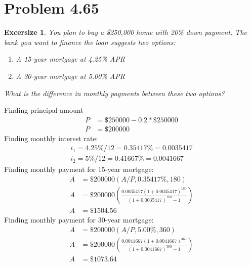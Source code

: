 \documentclass{report} %
\newtheorem{exrc}{Excersize}
\begin{document}
\section*{Problem 4.65}
\begin{exrc}
    You plan to buy a \$250,000 home with 20\% down payment. The bank you want to finance the loan suggests two options:
    \begin{enumerate}
        \item A 15-year mortgage at 4.25\% APR
        \item A 30-year mortgage at 5.00\% APR
    \end{enumerate}
    What is the difference in monthly payments between these two options?
\end{exrc}
Finding principal amount
\begin{equation*}
    \begin{aligned}
        P &= \$250000 - 0.2 * \$250000 \\
        P &= \$200000
    \end{aligned}
\end{equation*}
Finding monthly interest rate:
\begin{equation*}
    \begin{aligned}
        i_1 = 4.25\%/12 = 0.35417\% = 0.0035417 \\
        i_2 = 5\%/12 = 0.41667\% = 0.0041667
    \end{aligned}
\end{equation*}
Finding monthly payment for 15-year mortgage:
\begin{equation*}
    \begin{aligned}
        A &= \$200000(A/P,0.35417\%,180) \\
        A &= \$200000\left(\frac{0.0035417(1+0.0035417)^{180}}{(1+0.0035417)^{180}-1}\right) \\
        A &= \$1504.56
    \end{aligned}
\end{equation*} 
Finding monthly payment for 30-year mortgage:
\begin{equation*}
    \begin{aligned}
        A &= \$200000(A/P,5.00\%,360) \\
        A &= \$200000\left(\frac{0.0041667(1+0.0041667)^{360}}{(1+0.0041667)^{360}-1}\right) \\
        A &= \$1073.64
    \end{aligned}
\end{equation*}
\end{document}
